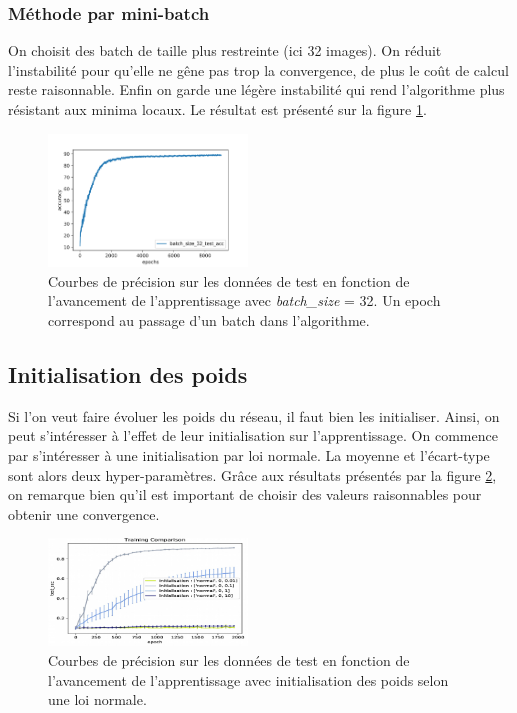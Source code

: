 \subsubsection{Méthode par mini-batch}
On choisit des batch de taille plus restreinte (ici 32 images). On réduit l'instabilité pour qu'elle ne gêne pas trop la convergence, de plus le coût de calcul reste raisonnable. Enfin on garde une légère instabilité qui rend l'algorithme plus résistant aux minima locaux. Le résultat est présenté sur la figure \ref{batch3}.

\begin{figure}[!h]
\centering
\includegraphics[width=150pt]{"images/MLP/batch32"}
\caption{Courbes de précision sur les données de test en fonction de l'avancement de l'apprentissage avec \textit{batch\_size} = 32. Un epoch correspond au passage d'un batch dans l'algorithme. }
\label{batch3}
\end{figure}


\subsection{Initialisation des poids}
Si l'on veut faire évoluer les poids du réseau, il faut bien les initialiser. Ainsi, on peut s'intéresser à l'effet de leur initialisation sur l'apprentissage.
On commence par s'intéresser à une initialisation par loi normale. La moyenne et l'écart-type sont alors deux hyper-paramètres. Grâce aux résultats présentés par la figure \ref{MLP_initnormale}, on remarque bien qu'il est important de choisir des valeurs raisonnables pour obtenir une convergence.

\begin{figure}[!h]
\centering
\includegraphics[width=150pt]{"images/MLP/MLP_initnormale"}
\caption{Courbes de précision sur les données de test en fonction de l'avancement de l'apprentissage avec initialisation des poids selon une loi normale.}
\label{MLP_initnormale}
\end{figure}

